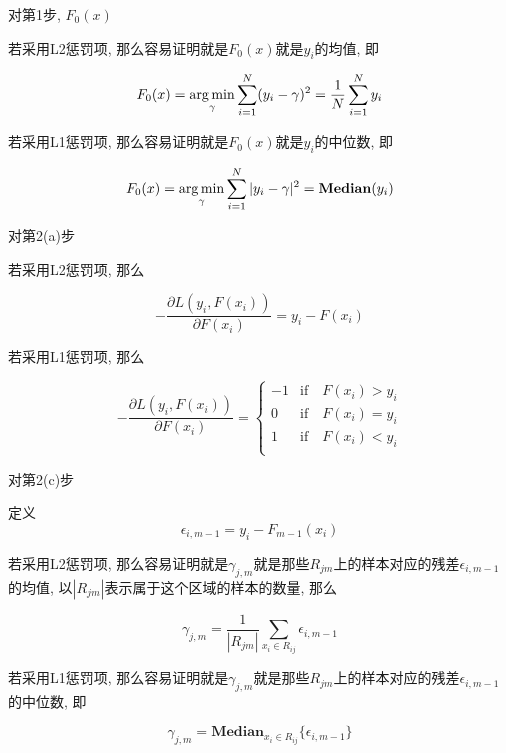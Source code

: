 \begin{remark}
    对第1步, $F_0(x)$

    若采用L2惩罚项, 那么容易证明就是$F_0(x)$就是$y_i$的均值, 即

    \begin{equation*}
        F_0(x) = \operatorname*{arg\,min}_\gamma \sum_{i=1}^N(y_i - \gamma)^2 = \frac{1}{N}\sum_{i=1}^Ny_i
    \end{equation*}

    若采用L1惩罚项, 那么容易证明就是$F_0(x)$就是$y_i$的中位数, 即

    \begin{equation*}
        F_0(x) = \operatorname*{arg\,min}_\gamma \sum_{i=1}^N|y_i - \gamma|^2 = \mathbf{Median}(y_i)
    \end{equation*}
\end{remark}

\begin{remark}

    对第2(a)步

    若采用L2惩罚项, 那么

    \begin{equation*}
        -\frac{\partial L(y_i, F(x_i))}{\partial F(x_i)} = y_i - F(x_i)
    \end{equation*}

    若采用L1惩罚项, 那么

    \begin{equation*}
        -\frac{\partial L(y_i, F(x_i))}{\partial F(x_i)} = \left\{\begin{array}{rcl}
            -1 & \text{if} \quad F(x_i) > y_i \\
            0  & \text{if} \quad F(x_i) = y_i \\
            1  & \text{if} \quad F(x_i) < y_i \\
        \end{array}
        \right.
    \end{equation*}

\end{remark}

\begin{remark}
    对第2(c)步

    定义
    \begin{equation*}
        \epsilon_{i, m-1} = y_i - F_{m-1}(x_i)
    \end{equation*}

    若采用L2惩罚项, 那么容易证明就是$\gamma_{j,m}$就是那些$R_{jm}$上的样本对应的残差$\epsilon_{i,m-1}$的均值, 以$|R_{jm}|$表示属于这个区域的样本的数量, 那么

    \begin{equation}
        \gamma_{j,m} = \frac{1}{|R_{jm}|}\sum_{x_i\in R_{ij}}\epsilon_{i, m-1}
    \end{equation}

    若采用L1惩罚项, 那么容易证明就是$\gamma_{j,m}$就是那些$R_{jm}$上的样本对应的残差$\epsilon_{i,m-1}$的中位数, 即

    \begin{equation}
        \gamma_{j,m} = \mathbf{Median}_{x_i\in R_{ij}}\big\{\epsilon_{i, m-1}\big\}
    \end{equation}

\end{remark}